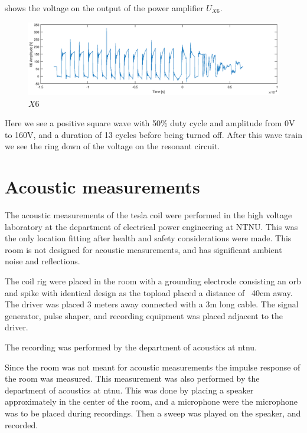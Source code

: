  shows the voltage on the output of the power amplifier $U_{X6}$.

\begin{figure}[H]
    \centering
    \includegraphics[trim={3.2cm 0cm 3.2cm 0cm},clip,width=\textwidth]{img/X6singlepulse.eps}
    \caption{$X6$}
    \label{fig:m_x6}
\end{figure}

Here we see a positive square wave with 50\% duty cycle and amplitude from 0V to 160V, and a duration of 13 cycles before being turned off. After this wave train we see the ring down of the voltage on the resonant circuit.

\newpage
\section{Acoustic measurements}

The acoustic measurements of the tesla coil were performed in the high voltage laboratory at the department of electrical power engineering at NTNU. This was the only location fitting after health and safety considerations were made. This room is not designed for acoustic measurements, and has significant ambient noise and reflections.

The coil rig were placed in the room with a grounding electrode consisting an orb and spike with identical design as the topload placed a distance of ~40cm away. The driver was placed 3 meters away connected with a 3m long cable. The signal generator, pulse shaper, and recording equipment was placed adjacent to the driver.

The recording was performed by the department of acoustics at ntnu.

Since the room was not meant for acoustic measurements the impulse response of the room was measured. This measurement was also performed by the department of acoustics at ntnu. This was done by placing a speaker approximately in the center of the room, and a microphone were the microphone was to be placed during recordings. Then a sweep was played on the speaker, and recorded.

